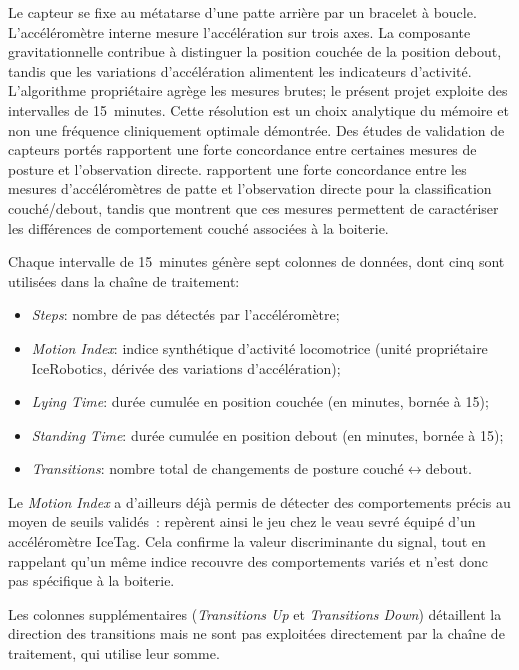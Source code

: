 Le capteur se fixe au métatarse d'une patte arrière par un bracelet à boucle.
L'accéléromètre interne mesure l'accélération sur trois axes. La composante gravitationnelle
contribue à distinguer la position couchée de la position debout, tandis que les variations
d'accélération alimentent les indicateurs d'activité. L'algorithme propriétaire agrège les
mesures brutes; le présent projet exploite des intervalles de 15~minutes. Cette résolution
est un choix analytique du mémoire et non une fréquence cliniquement optimale démontrée.
Des études de validation de capteurs portés rapportent une forte concordance entre certaines
mesures de posture et l'observation directe. \citet{alsaaod2012electronic} rapportent
une forte concordance entre les mesures d'accéléromètres de patte et l'observation directe
pour la classification couché/debout, tandis que \cite{blackie2011lying} montrent que ces
mesures permettent de caractériser les différences de comportement couché associées à la
boiterie.

Chaque intervalle de 15~minutes génère sept colonnes de données, dont cinq sont utilisées dans la
chaîne de traitement:
\begin{itemize}
    \item \textit{Steps}: nombre de pas détectés par l'accéléromètre;
    \item \textit{Motion Index}: indice synthétique d'activité locomotrice (unité
    propriétaire IceRobotics, dérivée des variations d'accélération);
    \item \textit{Lying Time}: durée cumulée en position couchée (en minutes, bornée à 15);
    \item \textit{Standing Time}: durée cumulée en position debout (en minutes, bornée à 15);
    \item \textit{Transitions}: nombre total de changements de posture
    couché$\leftrightarrow$debout.
\end{itemize}
Le \textit{Motion Index} a d'ailleurs déjà permis de détecter des comportements précis au
moyen de seuils validés~: \citet{mckay2024play} repèrent ainsi le jeu chez le veau sevré
équipé d'un accéléromètre IceTag. Cela confirme la valeur discriminante du signal, tout en
rappelant qu'un même indice recouvre des comportements variés et n'est donc pas spécifique à
la boiterie.

Les colonnes supplémentaires (\textit{Transitions Up} et \textit{Transitions Down})
détaillent la direction des transitions mais ne sont pas exploitées directement par la
chaîne de traitement, qui utilise leur somme.


